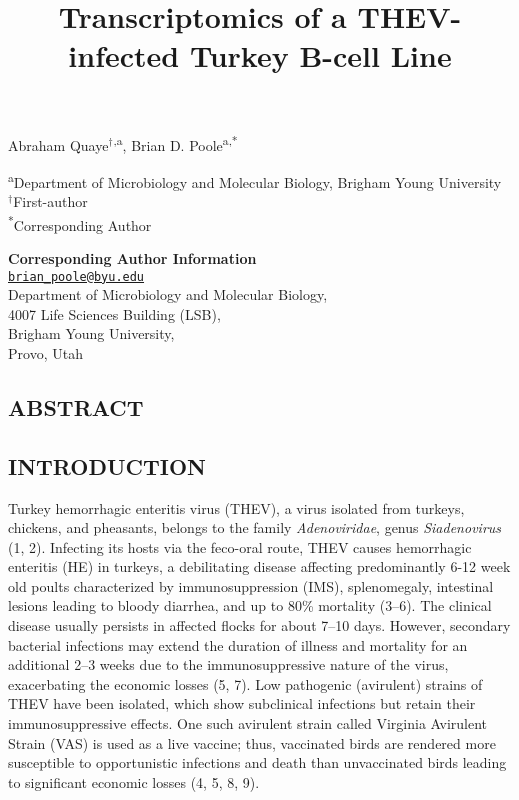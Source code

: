 \documentclass[
]{article}
\title{Transcriptomics of a THEV-infected Turkey B-cell Line}
\author{}
\date{\vspace{-2.5em}}
\begin{document}
\maketitle

\vspace{5mm}

Abraham Quaye\({^\dagger}\)\textsuperscript{,a}, Brian D.
Poole\textsuperscript{a,*}

\vspace{5mm}

\textsuperscript{a}Department of Microbiology and Molecular Biology,
Brigham Young University\\
\({^\dagger}\)First-author\\
\textsuperscript{*}Corresponding Author

\vspace{5mm}

\textbf{Corresponding Author Information}\\
\href{mailto:brian_poole@byu.edu}{\nolinkurl{brian\_poole@byu.edu}}\\
Department of Microbiology and Molecular Biology,\\
4007 Life Sciences Building (LSB),\\
Brigham Young University,\\
Provo, Utah\\

\newpage

\subsection{ABSTRACT}\label{abstract}

\newpage

\subsection{INTRODUCTION}\label{introduction}

Turkey hemorrhagic enteritis virus (THEV), a virus isolated from
turkeys, chickens, and pheasants, belongs to the family
\emph{Adenoviridae}, genus \emph{Siadenovirus} (1, 2). Infecting its
hosts via the feco-oral route, THEV causes hemorrhagic enteritis (HE) in
turkeys, a debilitating disease affecting predominantly 6-12 week old
poults characterized by immunosuppression (IMS), splenomegaly,
intestinal lesions leading to bloody diarrhea, and up to 80\% mortality
(3--6). The clinical disease usually persists in affected flocks for
about 7--10 days. However, secondary bacterial infections may extend the
duration of illness and mortality for an additional 2--3 weeks due to
the immunosuppressive nature of the virus, exacerbating the economic
losses (5, 7). Low pathogenic (avirulent) strains of THEV have been
isolated, which show subclinical infections but retain their
immunosuppressive effects. One such avirulent strain called Virginia
Avirulent Strain (VAS) is used as a live vaccine; thus, vaccinated birds
are rendered more susceptible to opportunistic infections and death than
unvaccinated birds leading to significant economic losses (4, 5, 8, 9).
\end{document}
